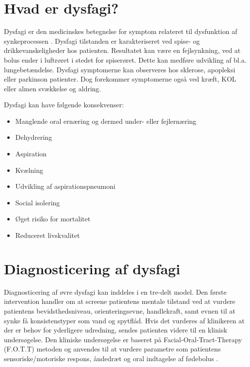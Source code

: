 \documentclass[main.tex]{subfiles}
\begin{document}
\section*{Hvad er dysfagi?}
Dysfagi er den medicinskes betegnelse for symptom relateret til dysfunktion af synkeprocessen \cite{KjaersgaardPh.d.studerendeDYSFAGIKonsekvenser}. Dysfagi tilstanden er karakteriseret ved spise- og drikkevanskeligheder hos patienten. Resultatet kan være en fejlsynkning, ved at bolus ender i luftrøret i stedet for spiserøret. Dette kan medføre udvikling af bl.a. lungebetændelse. Dysfagi symptomerne kan observeres hos sklerose, apopleksi eller parkinson patienter. Dog forekommer symptomerne også ved kræft, KOL eller almen svækkelse og aldring\cite{SallyRefsgaardTinesterbyKristensen2015DysfagiKommune}.

Dysfagi kan have følgende konsekvenser\cite[s. 12]{KjaersgaardPh.d.studerendeDYSFAGIKonsekvenser}:
\begin{itemize}
\item Manglende oral ernæring og dermed under- eller fejlernæring
\item Dehydrering
\item Aspiration
\item Kvælning
\item Udvikling af aspirationspneumoni
\item Social isolering
\item Øget risiko for mortalitet
\item Reduceret livskvalitet

\end{itemize}



\section*{Diagnosticering af dysfagi}


Diagnosticering af øvre dysfagi kan inddeles i en tre-delt model. Den første intervention handler om at screene patientens mentale tilstand ved at vurdere patientens bevidsthedsniveau, orienteringsevne, handlekraft, samt evnen til at synke få konsistenstyper som vand og spytflåd. Hvis det vurderes af klinikeren at der er behov for yderligere udredning, sendes patienten videre til en klinisk undersøgelse. Den kliniske undersøgelse er baseret på Facial-Oral-Tract-Therapy (F.O.T.T) metoden og anvendes til at vurdere parametre som patientens sensoriske/motoriske respons, åndedræt og oral indtagelse af fødebolus \cite[s. 23-25]{Kjaersgaard2013DifficultiesPerspective}. 
\end{document}
